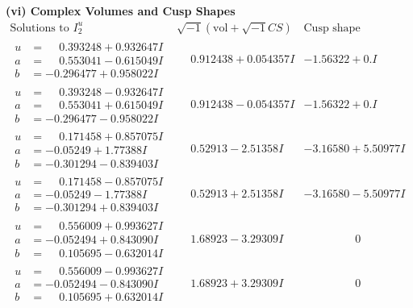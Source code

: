 \documentclass[1p]{elsarticle_modified}
\theoremstyle{definition}
\newcommand{\I}{\sqrt{-1}}
\begin{document}
\newpage\flushleft \textbf{(vi) Complex Volumes and Cusp Shapes}
$$\begin{array}{c|c|c}  
\text{Solutions to }I^u_{2}& \I (\text{vol} + \sqrt{-1}CS) & \text{Cusp shape}\\
 \hline 
\begin{aligned}
u &= \phantom{-}0.393248 + 0.932647 I \\
a &= \phantom{-}0.553041 - 0.615049 I \\
b &= -0.296477 + 0.958022 I\end{aligned}
 & \phantom{-}0.912438 + 0.054357 I & -1.56322 + 0. I\phantom{ +0.000000I} \\ \hline\begin{aligned}
u &= \phantom{-}0.393248 - 0.932647 I \\
a &= \phantom{-}0.553041 + 0.615049 I \\
b &= -0.296477 - 0.958022 I\end{aligned}
 & \phantom{-}0.912438 - 0.054357 I & -1.56322 + 0. I\phantom{ +0.000000I} \\ \hline\begin{aligned}
u &= \phantom{-}0.171458 + 0.857075 I \\
a &= -0.05249 + 1.77388 I \\
b &= -0.301294 - 0.839403 I\end{aligned}
 & \phantom{-}0.52913 - 2.51358 I & -3.16580 + 5.50977 I \\ \hline\begin{aligned}
u &= \phantom{-}0.171458 - 0.857075 I \\
a &= -0.05249 - 1.77388 I \\
b &= -0.301294 + 0.839403 I\end{aligned}
 & \phantom{-}0.52913 + 2.51358 I & -3.16580 - 5.50977 I \\ \hline\begin{aligned}
u &= \phantom{-}0.556009 + 0.993627 I \\
a &= -0.052494 + 0.843090 I \\
b &= \phantom{-}0.105695 - 0.632014 I\end{aligned}
 & \phantom{-}1.68923 - 3.29309 I & \phantom{-0.000000 } 0 \\ \hline\begin{aligned}
u &= \phantom{-}0.556009 - 0.993627 I \\
a &= -0.052494 - 0.843090 I \\
b &= \phantom{-}0.105695 + 0.632014 I\end{aligned}
 & \phantom{-}1.68923 + 3.29309 I & \phantom{-0.000000 } 0 \\ \hline\begin{aligned}

\end{aligned}
\end{array}$$
\end{document}
